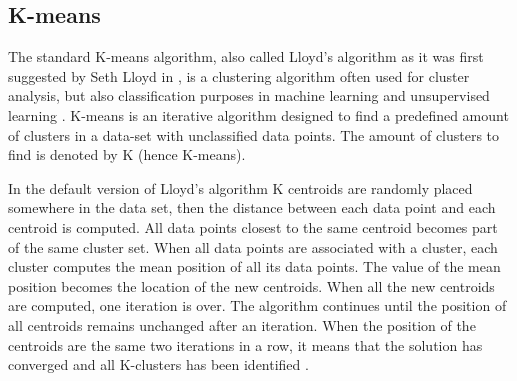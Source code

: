



\subsection{K-means}
The standard K-means algorithm, also called Lloyd's algorithm as it was first suggested by Seth Lloyd in \cite{sloyd}, is a clustering algorithm often used for cluster analysis, but also classification purposes in machine learning and unsupervised learning \cite{Coates2012}. K-means is an iterative algorithm designed to find a predefined amount of clusters in a data-set with unclassified data points. The amount of clusters to find is denoted by
K (hence K-means). 

In the default version of Lloyd's algorithm K centroids are randomly placed somewhere in the data set, then the distance between each data point and each centroid is computed. All data points
closest to the same centroid becomes part of the same cluster set. When all data points are associated with a cluster, each cluster computes the mean position of all its data points.
The value of the mean position becomes the location of the new centroids. When all the new centroids are computed, one iteration is over. The algorithm continues until the position 
of all centroids remains unchanged after an iteration. When the position of the centroids are the same two iterations in a row, it means that the solution has converged and all K-clusters has been identified \cite{mackaymeans}.

